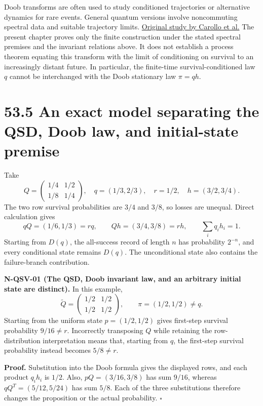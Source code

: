 \documentclass[
  11pt,
  oneside]{book}
\begin{document}
Doob transforms are often used to study conditioned trajectories or
alternative dynamics for rare events. General quantum versions involve
noncommuting spectral data and suitable trajectory limits.
\href{https://arxiv.org/abs/1711.10951}{Original study by Carollo et
al.} The present chapter proves only the finite construction under the
stated spectral premises and the invariant relations above. It does not
establish a process theorem equating this transform with the limit of
conditioning on survival to an increasingly distant future. In
particular, the finite-time survival-conditioned law \(q\) cannot be
interchanged with the Doob stationary law \(\pi=qh\).

\section{53.5 An exact model separating the QSD, Doob law, and
initial-state premise}

Take \[
Q=\begin{pmatrix}1/4&1/2\\1/8&1/4\end{pmatrix},\quad
q=(1/3,2/3),\quad r=1/2,\quad h=(3/2,3/4).
\] The two row survival probabilities are \(3/4\) and \(3/8\), so losses
are unequal. Direct calculation gives \[
qQ=(1/6,1/3)=rq,\qquad
Qh=(3/4,3/8)=rh,\qquad \sum_iq_ih_i=1.
\] Starting from \(D(q)\), the all-success record of length \(n\) has
probability \(2^{-n}\), and every conditional state remains \(D(q)\).
The unconditional state also contains the failure-branch contribution.

\label{n-qsv-01}{}

\textbf{N-QSV-01 (The QSD, Doob invariant law, and an arbitrary initial
state are distinct).} In this example, \[
\widetilde Q=\begin{pmatrix}1/2&1/2\\1/2&1/2\end{pmatrix},\qquad
\pi=(1/2,1/2)\ne q.
\] Starting from the uniform state \(p=(1/2,1/2)\) gives first-step
survival probability \(9/16\ne r\). Incorrectly transposing \(Q\) while
retaining the row-distribution interpretation means that, starting from
\(q\), the first-step survival probability instead becomes \(5/8\ne r\).

\textbf{Proof.} Substitution into the Doob formula gives the displayed
rows, and each product \(q_ih_i\) is \(1/2\). Also, \(pQ=(3/16,3/8)\)
has sum \(9/16\), whereas \(qQ^T=(5/12,5/24)\) has sum \(5/8\). Each of
the three substitutions therefore changes the proposition or the actual
probability. \(\square\)
\end{document}
